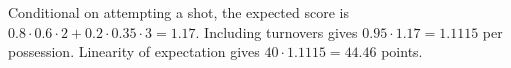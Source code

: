 Conditional on attempting a shot, the expected score is $0.8\cdot0.6\cdot2+0.2\cdot0.35\cdot3=1.17$. Including turnovers gives $0.95\cdot1.17=1.1115$ per possession. Linearity of expectation gives $40\cdot1.1115=\boxed{44.46}$ points.
